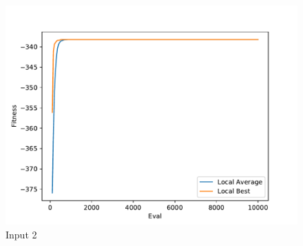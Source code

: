 \documentclass{standalone}
\begin{document}
\begin{figure}[!htb]
	\caption{Input 2}
	\label{fig:graph_2033}
	\includegraphics[width=\textwidth]{../graphs/graphs/2033.pdf}
\end{figure}
\end{document}
